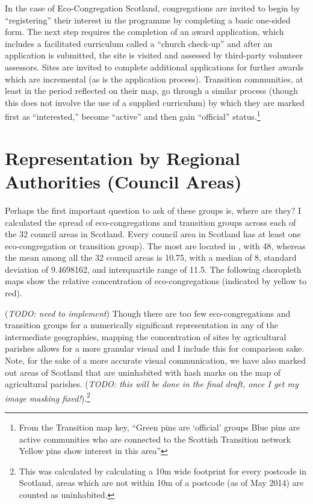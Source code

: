 \documentclass[11pt,]{article}
\let\rmarkdownfootnote\footnote%
\def\footnote{\protect\rmarkdownfootnote}
\begin{document}
In the case of Eco-Congregation Scotland, congregations are invited to
begin by ``registering'' their interest in the programme by completing a
basic one-sided form. The next step requires the completion of an award
application, which includes a facilitated curriculum called a ``church
check-up'' and after an application is submitted, the site is visited
and assessed by third-party volunteer assessors. Sites are invited to
complete additional applications for further awards which are
incremental (as is the application process). Transition communities, at
least in the period reflected on their map, go through a similar process
(though this does not involve the use of a supplied curriculum) by which
they are marked first as ``interested,'' become ``active'' and then gain
``official'' status.\footnote{From the Transition map key, ``Green pins
  are `official' groups Blue pins are active communities who are
  connected to the Scottish Transition network Yellow pins show interest
  in this area''}

\hypertarget{representation-by-regional-authorities-council-areas}{%
\section{Representation by Regional Authorities (Council
Areas)}\label{representation-by-regional-authorities-council-areas}}

Perhaps the first important question to ask of these groups is, where
are they? I calculated the spread of eco-congregations and transition
groups across each of the 32 council areas in Scotland. Every council
area in Scotland has at least one eco-congregation or transition group).
The most are located in , with 48, whereas the mean among all the 32
council areas is 10.75, with a median of 8, standard deviation of
9.4698162, and interquartile range of 11.5. The following choropleth
maps show the relative concentration of eco-congregations (indicated by
yellow to red).

(\emph{TODO: need to implement}) Though there are too few
eco-congregations and transition groups for a numerically significant
representation in any of the intermediate geographies, mapping the
concentration of sites by agricultural parishes allows for a more
granular visual and I include this for comparison sake. Note, for the
sake of a more accurate visual communication, we have also marked out
areas of Scotland that are uninhabited with hash marks on the map of
agricultural parishes. (\emph{TODO: this will be done in the final
draft, once I get my image masking fixed!}).\footnote{This was
  calculated by calculating a 10m wide footprint for every postcode in
  Scotland, areas which are not within 10m of a postcode (as of May
  2014) are counted as uninhabited.}
\end{document}
